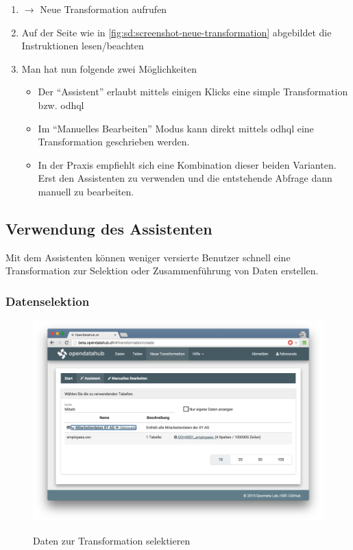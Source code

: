 \begin{enumerate}
\item {} $\to$ Neue Transformation aufrufen
\item Auf der Seite wie in \cref{fig:sd:screenshot-neue-transformation} abgebildet die Instruktionen lesen/beachten
\item Man hat nun folgende zwei Möglichkeiten
	\begin{itemize}
	\item Der ``Assistent'' erlaubt mittels einigen Klicks eine simple Transformation bzw. \acs{odhql} 
	\item Im ``Manuelles Bearbeiten'' Modus kann direkt mittels \acs{odhql} eine Transformation geschrieben werden.
	\item In der Praxis empfiehlt sich eine Kombination dieser beiden Varianten. Erst den Assistenten zu verwenden und die entstehende Abfrage dann manuell zu bearbeiten.
	\end{itemize}
\end{enumerate}


\subsection{Verwendung des Assistenten}

Mit dem Assistenten können weniger versierte Benutzer schnell eine Transformation zur Selektion oder Zusammenführung von Daten erstellen.

\subsubsection{Datenselektion}

\begin{figure}[H]
	\centering
	\includegraphics[width=\linewidth]{fig/screenshot-tabelle-selektieren}
	\label{fig:sd:screenshot-tabelle-selektieren}
	\caption{Daten zur Transformation selektieren}
\end{figure}

